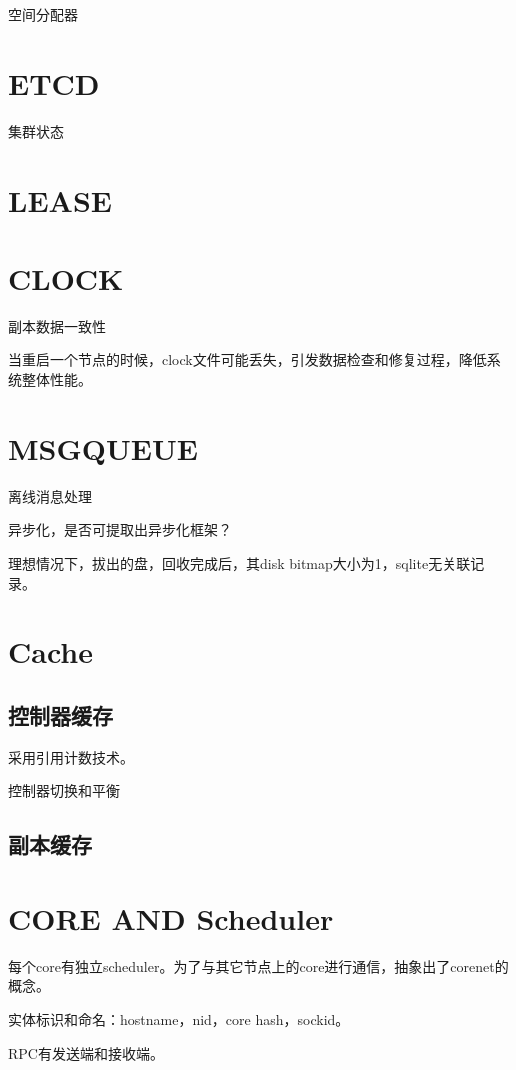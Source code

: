 空间分配器

\section{ETCD}

集群状态

\section{LEASE}

\section{CLOCK}

副本数据一致性

当重启一个节点的时候，clock文件可能丢失，引发数据检查和修复过程，降低系统整体性能。

\section{MSGQUEUE}

离线消息处理

异步化，是否可提取出异步化框架？

理想情况下，拔出的盘，回收完成后，其disk bitmap大小为1，sqlite无关联记录。

\section{Cache}

\subsection{控制器缓存}

采用引用计数技术。

控制器切换和平衡

\subsection{副本缓存}

\section{CORE AND Scheduler}

每个core有独立scheduler。为了与其它节点上的core进行通信，抽象出了corenet的概念。

实体标识和命名：hostname，nid，core hash，sockid。

RPC有发送端和接收端。

